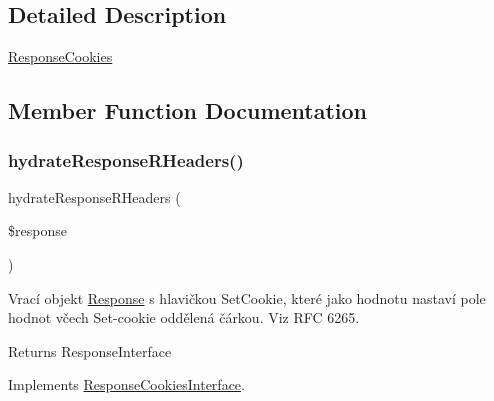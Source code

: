 \subsection{Detailed Description}
\mbox{\hyperlink{class_pes_1_1_http_1_1_cookies_1_1_response_cookies}{Response\+Cookies}} 

\subsection{Member Function Documentation}
\mbox{\label{class_pes_1_1_http_1_1_cookies_1_1_response_cookies_a7e113803ed4166b2bab9f6f68ca75921}} 
\subsubsection{\texorpdfstring{hydrate\+Response\+R\+Headers()}{hydrateResponseRHeaders()}}
{\footnotesize\ttfamily hydrate\+Response\+R\+Headers (\begin{DoxyParamCaption}\item[{Response\+Interface}]{\$response }\end{DoxyParamCaption})}

Vrací objekt \mbox{\hyperlink{class_pes_1_1_http_1_1_response}{Response}} s hlavičkou Set\+Cookie, které jako hodnotu nastaví pole hodnot včech Set-\/cookie oddělená čárkou. Viz R\+FC 6265.

\begin{DoxyReturn}{Returns}
Response\+Interface 
\end{DoxyReturn}


Implements \mbox{\hyperlink{interface_pes_1_1_http_1_1_cookies_1_1_response_cookies_interface_a7e113803ed4166b2bab9f6f68ca75921}{Response\+Cookies\+Interface}}.

\mbox{\label{class_pes_1_1_http_1_1_cookies_1_1_response_cookies_a462328426f473092af4994841a3bb3de}} 
